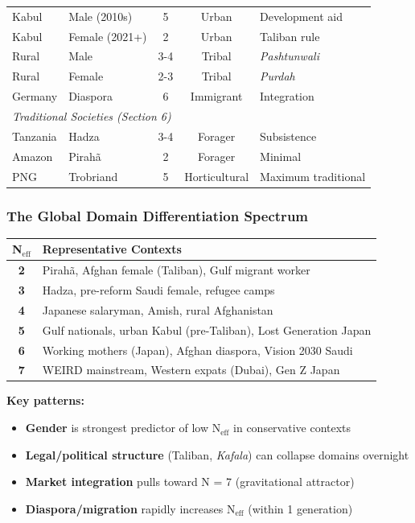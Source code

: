 \begin{center}
\begin{longtable}{@{}llccp{4cm}@{}}
Kabul & Male (2010s) & 5 & Urban & Development aid \\
Kabul & Female (2021+) & 2 & Urban & Taliban rule \\
Rural & Male & 3-4 & Tribal & \textit{Pashtunwali} \\
Rural & Female & 2-3 & Tribal & \textit{Purdah} \\
Germany & Diaspora & 6 & Immigrant & Integration \\
\midrule
\multicolumn{5}{l}{\textit{Traditional Societies (Section 6)}} \\
Tanzania & Hadza & 3-4 & Forager & Subsistence \\
Amazon & Pirahã & 2 & Forager & Minimal \\
PNG & Trobriand & 5 & Horticultural & Maximum traditional \\
\end{longtable}
\end{center}

\subsubsection{The Global Domain Differentiation Spectrum}

\begin{tcolorbox}[colback=gray!5!white, colframe=gray!75!black, title=Empirical Finding: N$_{\text{eff}}$ Ranges from 2 to 7 Globally]

\begin{center}
\begin{tabular}{@{}cl@{}}
\toprule
\textbf{N$_{\text{eff}}$} & \textbf{Representative Contexts} \\
\midrule
\textbf{2} & Pirahã, Afghan female (Taliban), Gulf migrant worker \\
\textbf{3} & Hadza, pre-reform Saudi female, refugee camps \\
\textbf{4} & Japanese salaryman, Amish, rural Afghanistan \\
\textbf{5} & Gulf nationals, urban Kabul (pre-Taliban), Lost Generation Japan \\
\textbf{6} & Working mothers (Japan), Afghan diaspora, Vision 2030 Saudi \\
\textbf{7} & WEIRD mainstream, Western expats (Dubai), Gen Z Japan \\
\bottomrule
\end{tabular}
\end{center}

\textbf{Key patterns:}
\begin{itemize}[nosep]
\item \textbf{Gender} is strongest predictor of low N$_{\text{eff}}$ in conservative contexts
\item \textbf{Legal/political structure} (Taliban, \textit{Kafala}) can collapse domains overnight
\item \textbf{Market integration} pulls toward N = 7 (gravitational attractor)
\item \textbf{Diaspora/migration} rapidly increases N$_{\text{eff}}$ (within 1 generation)
\end{itemize}

\end{tcolorbox}

